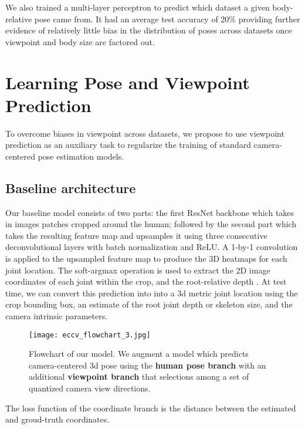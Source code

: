 \documentclass[runningheads]{llncs}
\begin{document}
We also trained a multi-layer perceptron to predict which dataset a
given body-relative pose came from. It had an average test accuracy of 20\%
providing further evidence of relatively little bias in the distribution of
poses across datasets once viewpoint and body size are factored out.

\section{Learning Pose and Viewpoint Prediction}
\label{sec:bcframe}

To overcome biases in viewpoint across datasets, we propose to use viewpoint
prediction as an auxiliary task to regularize the training of standard
camera-centered pose estimation models.

\subsection{Baseline architecture}
Our baseline model \cite{rootnet,Zhou_2017_ICCV}  consists of two parts: the
first ResNet \cite{resnet} backbone which takes in images patches cropped
around the human; followed by the second part which takes the resulting feature
map and upsamples it using three consecutive deconvolutional layers with batch
normalization and ReLU.  A 1-by-1 convolution is applied to the upsampled
feature map to produce the 3D heatmaps for each joint location.  The
soft-argmax \cite{integral} operation is used to extract the 2D image
coordinates  of each joint  within the crop, and the
root-relative depth .  At test time, we can convert this prediction into
into a 3d metric joint location  using the crop bounding
box, an estimate of the root joint depth or skeleton size, and the camera
intrinsic parameters.

\begin{figure}[t]
\begin{center}
   \texttt{[image: eccv\_flowchart\_3.jpg]}
\end{center}
   \caption{Flowchart of our model. 
We augment a model which predicts camera-centered 3d pose using the
   \textbf{human pose branch} with an additional \textbf{viewpoint branch} 
   that selections among a set of quantized camera view directions.
}
\label{fig:posenetflowchart}
\vspace{-0.15in}
\end{figure}

The loss function of the coordinate branch is the  distance between the
estimated and groud-truth coordinates. 
\end{document}
